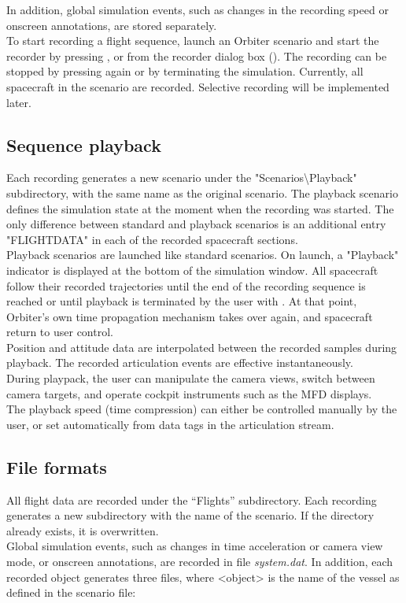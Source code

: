 \documentclass[Orbiter Technical Reference.tex]{subfiles}
\begin{document}
\noindent
In addition, global simulation events, such as changes in the recording speed or onscreen annotations, are stored separately.\\
To start recording a flight sequence, launch an Orbiter scenario and start the recorder by pressing \Ctrl{}, or from the recorder dialog box (\Ctrl{}). The recording can be stopped by pressing \Ctrl{} again or by terminating the simulation. Currently, all spacecraft in the scenario are recorded. Selective recording will be implemented later.


\subsection{Sequence playback}
Each recording generates a new scenario under the "Scenarios\textbackslash Playback" subdirectory, with the same name as the original scenario. The playback scenario defines the simulation state at the moment when the recording was started. The only difference between standard and playback scenarios is an additional entry "FLIGHTDATA" in each of the recorded spacecraft sections.\\
Playback scenarios are launched like standard scenarios. On launch, a "Playback" indicator is displayed at the bottom of the simulation window. All spacecraft follow their recorded trajectories until the end of the recording sequence is reached or until playback is terminated by the user with \Ctrl{}. At that point, Orbiter’s own time propagation mechanism takes over again, and spacecraft return to user control.\\
Position and attitude data are interpolated between the recorded samples during playback. The recorded articulation events are effective instantaneously.\\
During playpack, the user can manipulate the camera views, switch between camera targets, and operate cockpit instruments such as the MFD displays.\\
The playback speed (time compression) can either be controlled manually by the user, or set automatically from data tags in the articulation stream.


\subsection{File formats}
All flight data are recorded under the “Flights” subdirectory. Each recording generates a new subdirectory with the name of the scenario. If the directory already exists, it is overwritten.\\
Global simulation events, such as changes in time acceleration or camera view mode, or onscreen annotations, are recorded in file \textit{system.dat}. In addition, each recorded object generates three files, where <object> is the name of the vessel as defined in the scenario file:
\end{document}
